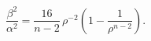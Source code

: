 \begin{equation}
\frac{\beta^{2}}{\alpha^{2}}=\frac{16}{n-2}\,\rho^{-2}\left(1-\frac{1}{\rho^{n-2}}\right)\label{sqshr}.
\end{equation}

